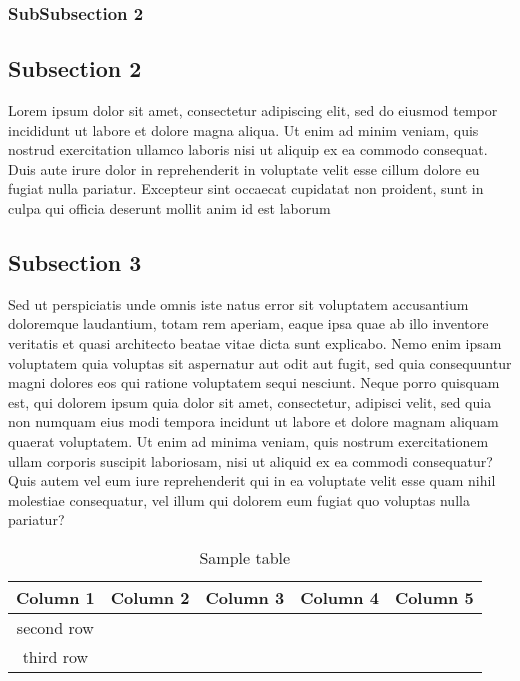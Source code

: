 \subsubsection{SubSubsection 2}

\subsection{Subsection 2}
Lorem ipsum dolor sit amet, consectetur adipiscing elit, sed do eiusmod tempor incididunt ut labore et dolore magna aliqua. Ut enim ad minim veniam, quis nostrud exercitation ullamco laboris nisi ut aliquip ex ea commodo consequat. Duis aute irure dolor in reprehenderit in voluptate velit esse cillum dolore eu fugiat nulla pariatur. Excepteur sint occaecat cupidatat non proident, sunt in culpa qui officia deserunt mollit anim id est laborum
\subsection{Subsection 3}
Sed ut perspiciatis unde omnis iste natus error sit voluptatem accusantium doloremque laudantium, totam rem aperiam, eaque ipsa quae ab illo inventore veritatis et quasi architecto beatae vitae dicta sunt explicabo. Nemo enim ipsam voluptatem quia voluptas sit aspernatur aut odit aut fugit, sed quia consequuntur magni dolores eos qui ratione voluptatem sequi nesciunt. Neque porro quisquam est, qui dolorem ipsum quia dolor sit amet, consectetur, adipisci velit, sed quia non numquam eius modi tempora incidunt ut labore et dolore magnam aliquam quaerat voluptatem. Ut enim ad minima veniam, quis nostrum exercitationem ullam corporis suscipit laboriosam, nisi ut aliquid ex ea commodi consequatur? Quis autem vel eum iure reprehenderit qui in ea voluptate velit esse quam nihil molestiae consequatur, vel illum qui dolorem eum fugiat quo voluptas nulla pariatur?



\begin{table}[ht]
	\caption{Sample table}
	\label{tab1}
	\centering
	\begin{tabular}{|c|c|c|c|c|}
		
		\hline
		Column 1 & Column 2 & Column 3 & Column 4 & Column 5 \\
		\hline
		second row & & & & \\
		\hline
		third row & & & & \\
		\hline
	\end{tabular}
\end{table}


